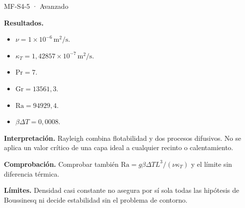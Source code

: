 \begin{studiumworked}{MF-S4-5 · Avanzado}
\begin{enumerate}
\end{enumerate}

\textbf{Resultados.}\begin{itemize}

\item $\nu=1\times10^{-6}\,\mathrm{m^2/s}$.

\item $\kappa_T=1{,}42857\times10^{-7}\,\mathrm{m^2/s}$.

\item $\mathrm{Pr}=7$.

\item $\mathrm{Gr}=13561{,}3$.

\item $\mathrm{Ra}=94929{,}4$.

\item $\beta\Delta T=0{,}0008$.

\end{itemize}

\textbf{Interpretación.} Rayleigh combina flotabilidad y dos procesos difusivos. No se aplica un valor crítico de una capa ideal a cualquier recinto o calentamiento.

\textbf{Comprobación.} Comprobar también $\mathrm{Ra}=g\beta\Delta TL^3/(\nu\kappa_T)$ y el límite sin diferencia térmica.

\textbf{Límites.} Densidad casi constante no asegura por sí sola todas las hipótesis de Boussinesq ni decide estabilidad sin el problema de contorno.

\end{studiumworked}

\studiumchaptercheck
